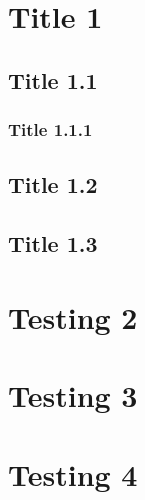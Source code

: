 \documentclass[12pt,a4paper]{article}
\begin{document}
\tableofcontents
\newpage
{}
\setcounter{page}{1}

\section{Title 1}

\subsection{Title 1.1}

\subsubsection{Title 1.1.1}
\newpage
\subsection{Title 1.2}
\newpage
\subsection{Title 1.3}






\begin{multicols}{2}
\end{multicols}
\newpage
\section{Testing 2}
\newpage
\section{Testing 3}
\newpage
\section{Testing 4}




\newpage
\begin{thebibliography}{7}

\end{thebibliography}
\end{document}
